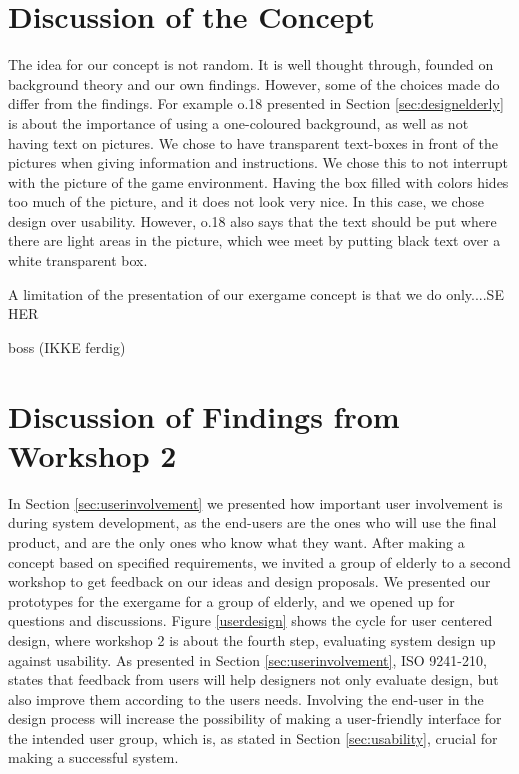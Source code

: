 \section{Discussion of the Concept}
\label{sec:discconcept}
The idea for our concept is not random. It is well thought through, founded on background theory and our own findings. However, some of the choices made do differ from the findings. For example o.18 presented in Section \ref{sec:designelderly} is about the importance of using a one-coloured background, as well as not having text on pictures. We chose to have transparent text-boxes in front of the pictures when giving information and instructions. We chose this to not interrupt with the picture of the game environment. Having the box filled with colors hides too much of the picture, and it does not look very nice. In this case, we chose design over usability. However, o.18 also says that the text should be put where there are light areas in the picture, which wee meet by putting black text over a white transparent box.    

A limitation of the presentation of our exergame concept is that we do only....SE HER

boss (IKKE ferdig)

\section{Discussion of Findings from Workshop 2}
\label{sec:discfindings2}
In Section \ref{sec:userinvolvement} we presented how important user involvement is during system development, as the end-users are the ones who will use the final product, and are the only ones who know what they want. After making a concept based on specified requirements, we invited a group of elderly to a second workshop to get feedback on our ideas and design proposals. We presented our prototypes for the exergame for a group of elderly, and we opened up for questions and discussions. Figure \ref{userdesign} shows the cycle for user centered design, where workshop 2 is about the fourth step, evaluating system design up against usability. As presented in Section \ref{sec:userinvolvement}, ISO 9241-210, states that feedback from users will help designers not only evaluate design, but also improve them according to the users needs. Involving the end-user in the design process will increase the possibility of making a user-friendly interface for the intended user group, which is, as stated in Section \ref{sec:usability}, crucial for making a successful system. 

